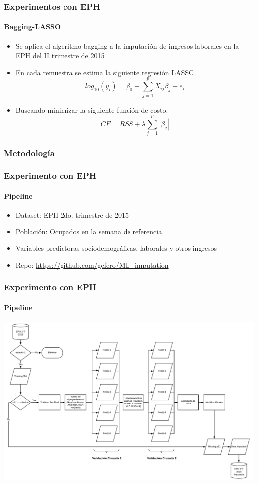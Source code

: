 \documentclass{beamer}
\begin{document}
\begin{frame}
\frametitle{Experimentos con EPH}
\framesubtitle{Bagging-LASSO}
\begin{itemize}
\item{Se aplica el algoritmo bagging a la imputación de ingresos laborales en la EPH del II trimestre de 2015}
\item{En cada remuestra se estima la siguiente regresión LASSO}
\begin{equation}
log_{10}(y_{i}) = \beta_{0} + \sum_{j=1}^pX_{ij}\beta_{j} + e_{i}
\end{equation}
\item{Buscando minimizar la siguiente función de costo:}
\begin{equation}
CF = RSS + \lambda\sum_{j=1}^p|\beta_{j}|
\end{equation}
\end{itemize}
\end{frame}


\subsubsection{Metodología}
\begin{frame}
\frametitle{Experimento con EPH}
\framesubtitle{Pipeline}
\begin{itemize}
	\item Dataset: EPH 2do. trimestre de 2015
	\item Población: Ocupados en la semana de referencia
	\item Variables predictoras sociodemográficas, laborales y otros ingresos
	\item Repo: \href{https://github.com/gefero/ML_imputation}{https://github.com/gefero/ML\_imputation}
\end{itemize}
\end{frame}

\begin{frame}
\frametitle{Experimento con EPH}
\framesubtitle{Pipeline}
\includegraphics[width=0.99\linewidth, height=0.7\textheight]{../img/pipeline}
\end{frame}
\end{document}
